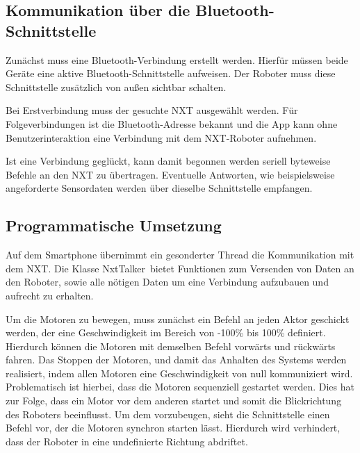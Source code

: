 \subsection{Kommunikation über die Bluetooth-Schnittstelle}

Zunächst muss eine Bluetooth-Verbindung erstellt werden. Hierfür müssen beide Geräte eine aktive Bluetooth-Schnittstelle aufweisen. Der Roboter muss diese Schnittstelle zusätzlich von außen sichtbar schalten.

Bei Erstverbindung muss der gesuchte NXT ausgewählt werden. Für Folgeverbindungen ist die Bluetooth-Adresse bekannt und die App kann ohne Benutzerinteraktion eine Verbindung mit dem NXT-Roboter aufnehmen.

Ist eine Verbindung geglückt, kann damit begonnen werden seriell byteweise Befehle an den NXT zu übertragen. Eventuelle Antworten, wie beispielsweise angeforderte Sensordaten werden über dieselbe Schnittstelle empfangen.

\subsection{Programmatische Umsetzung}

Auf dem Smartphone übernimmt ein gesonderter Thread die Kommunikation mit dem NXT. Die Klasse \glqq NxtTalker\grqq\ bietet Funktionen zum Versenden von Daten an den Roboter, sowie alle nötigen Daten um eine Verbindung aufzubauen und aufrecht zu erhalten.

Um die Motoren zu bewegen, muss zunächst ein Befehl an jeden Aktor geschickt werden, der eine Geschwindigkeit im Bereich von -100\% bis 100\% definiert. Hierdurch können die Motoren mit demselben Befehl vorwärts und rückwärts fahren. Das Stoppen der Motoren, und damit das Anhalten des Systems werden realisiert, indem allen Motoren eine Geschwindigkeit von null kommuniziert wird. Problematisch ist hierbei, dass die Motoren sequenziell gestartet werden. Dies hat zur Folge, dass ein Motor vor dem anderen startet und somit die Blickrichtung des Roboters beeinflusst. Um dem vorzubeugen, sieht die Schnittstelle einen Befehl vor, der die Motoren synchron starten lässt. Hierdurch wird verhindert, dass der Roboter in eine undefinierte Richtung abdriftet.
